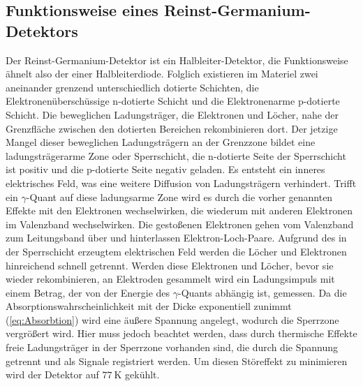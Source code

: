 \subsection{Funktionsweise eines Reinst-Germanium-Detektors}
Der Reinst-Germanium-Detektor ist ein Halbleiter-Detektor, die Funktionsweise ähnelt also der einer Halbleiterdiode.
Folglich existieren im Materiel zwei aneinander grenzend unterschiedlich dotierte Schichten, die Elektronenüberschüssige n-dotierte Schicht und die Elektronenarme p-dotierte Schicht.
Die beweglichen Ladungsträger, die Elektronen und Löcher, nahe der Grenzfläche zwischen den dotierten Bereichen rekombinieren dort.
Der jetzige Mangel dieser beweglichen Ladungsträgern an der Grenzzone bildet eine ladungsträgerarme Zone oder Sperrschicht, die n-dotierte Seite der Sperrschicht ist positiv und die p-dotierte Seite negativ geladen.
Es entsteht ein inneres elektrisches Feld, was eine weitere Diffusion von Ladungsträgern verhindert.
Trifft ein $\gamma$-Quant auf diese ladungsarme Zone wird es durch die vorher genannten Effekte mit den Elektronen wechselwirken, die wiederum mit anderen Elektronen im Valenzband wechselwirken.
Die gestoßenen Elektronen gehen vom Valenzband zum Leitungsband über und hinterlassen Elektron-Loch-Paare.
Aufgrund des in der Sperrschicht erzeugtem elektrischen Feld werden die Löcher und Elektronen hinreichend schnell getrennt.
Werden diese Elektronen und Löcher, bevor sie wieder rekombinieren, an Elektroden gesammelt wird ein Ladungsimpuls mit einem Betrag, der von der Energie des $\gamma$-Quants abhängig ist, gemessen.
Da die Absorptionswahrscheinlichkeit mit der Dicke exponentiell zunimmt (\ref{eq:Absorbtion}) wird eine äußere Spannung angelegt, wodurch die Sperrzone vergrößert wird.
Hier muss jedoch beachtet werden, dass durch thermische Effekte freie Ladungsträger in der Sperrzone vorhanden sind, die durch die Spannung getrennt und als Signale registriert werden.
Um diesen Störeffekt zu minimieren wird der Detektor auf $\SI{77}{\kelvin}$ gekühlt.

